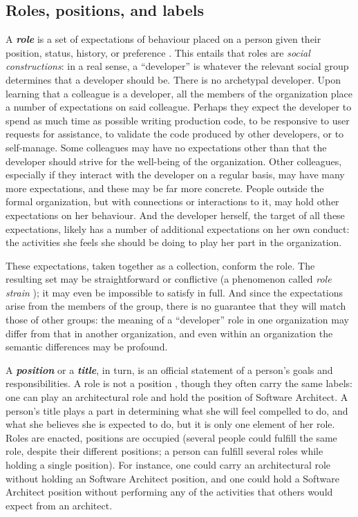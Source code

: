 \documentclass[10pt, conference, compsocconf]{IEEEtran}
\begin{document}
\subsection{Roles, positions, and labels}

A \textbf{\emph{role}} is a set of expectations of behaviour placed on a person given their position, status, history, or preference \cite{Turner1956,Gordon1976,Rizzo1970}. This entails that roles are \emph{social constructions}: in a real sense, a ``developer'' is whatever the relevant social group determines that a developer should be. There is no archetypal developer. Upon learning that a colleague is a developer, all the members of the organization place a number of expectations on said colleague. Perhaps they expect the developer to spend as much time as possible writing production code, to be responsive to user requests for assistance, to validate the code produced by other developers, or to self-manage. Some colleagues may have no expectations other than that the developer should strive for the well-being of the organization. Other colleagues, especially if they interact with the developer on a regular basis, may have many more expectations, and these may be far more concrete. People outside the formal organization, but with connections or interactions to it, may hold other expectations on her behaviour. And the developer herself, the target of all these expectations, likely has a number of additional expectations on her own conduct: the activities she feels she should be doing to play her part in the organization.

These expectations, taken together as a collection, conform the role. The resulting set may be straightforward or conflictive (a phenomenon called \emph{role strain} \cite{Goode1960}); it may even be impossible to satisfy in full. And since the expectations arise from the members of the group, there is no guarantee that they will match those of other groups: the meaning of a ``developer'' role in one organization may differ from that in another organization, and even within an organization the semantic differences may be profound.

A \textbf{\emph{position}} or a \textbf{\emph{title}}, in turn, is an official statement of a person's goals and responsibilities. A role is not a position \cite{Turner1956}, though they often carry the same labels: one can play an architectural role and hold the position of Software Architect. A person's title plays a part in determining what she will feel compelled to do, and what she believes she is expected to do, but it is only one element of her role. Roles are enacted, positions are occupied (several people could fulfill the same role, despite their different positions; a person can fulfill several roles while holding a single position). For instance, one could carry an architectural role without holding an Software Architect position, and one could hold a Software Architect position without performing any of the activities that others would expect from an architect.
\end{document}
